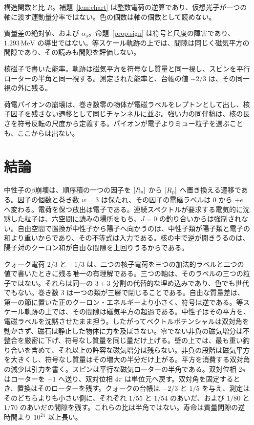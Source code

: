 \documentclass[a4paper]{article}
\begin{document}
構造関数と比 \(R\)。補題~\ref{lem:chart} は整数電荷の逆算であり、仮想光子が一つの軸に渡す運動量分率ではない。色の個数は軸の個数として読めない。

質量差の絶対値、および \(\alpha_s\)。命題~\ref{prop:sign} は符号と尺度の障害であり、\(1.293\,\mathrm{MeV}\) の導出ではない。等スケール軌跡の上では、間隙は同じく磁気平方の間隙であり、その読みも間隙を評価しない。

核磁子で書いた能率。軌跡は磁気平方を符号なし質量と同一視し、スピンを平行ローターの半角と同一視する。測定された能率と、台帳の値 \(-2/3\) は、その同一視の外に残る。

荷電パイオンの崩壊は、巻き数零の物体が電磁ラベルをレプトンとして出し、核子因子を残さない遷移として同じチャンネルに並ぶ。強い力の同伴稿は、核の長さを符号反転の尺度から定義する。パイオンが電子よりミュー粒子を選ぶことも、ここからは出ない。

\section{結論}
\label{sec:conclusion}

中性子の\(\beta\)崩壊は、順序積の一つの因子を \([R_{\rm n}]\) から \([R_{\rm p}]\) へ置き換える遷移である。因子の個数と巻き数 \(w=3\) は保たれ、その因子の電磁ラベルは \(0\) から \(+e\) へ変わる。電荷を保つ放出は電子である。連続スペクトルが要求する電気的に沈黙した粒子は、六空間に読みの場所をもち、\(J=0\) の釣り合いからは強制されない。自由空間で置換が中性子から陽子へ向かうのは、中性子類が陽子類と電子の和より重いからであり、その不等式は入力である。核の中で逆が開きうるのは、陽子対のクーロン和が自由な間隙を上回りうるからである。

クォーク電荷 \(2/3\) と \(-1/3\) は、二つの核子電荷を三つの加法的ラベルと二つの値で書いたときに残る唯一の有理解である。三つの軸は、そのラベルの三つの粒子ではない。それらは同一の \(3+3\) 分割の代替的な埋め込みであり、色でも世代でもない。巻き数 \(3\) は一つの類が三層で閉じることである。自由な質量差は、第一の節に置いた正のクーロン・エネルギーより小さく、符号は逆である。等スケール軌跡の上では、その間隙は磁気平方の超過である。中性子はその平方を、電磁ラベルを沈黙させたまま担う。したがってベクトルポテンシャルは双対角を動かさず、磁石は静止した物体に力を及ぼさない。零でない非負の磁気増分は不整合を厳密に下げ、符号なし質量を同じ量だけ上げる。壁の上では、最も重い釣り合いを含めて、それ以上の許容な磁気増分は残らない。非負の段階は磁気平方を大きくし、符号なし質量はその増大の半分だけ上がる。平方を消費する双対角の減少は引力を書く。スピンは平行な磁気ローターの半角である。双対位相 \(2\pi\) はローターを \(-1\) へ送り、双対位相 \(4\pi\) は単位元へ戻す。双対角を固定するとき、置換はそのローターを残す。クォークの台帳は \(-2/3\) と \(1/5\) を与え、測定はそのどちらよりも小さい側に、それぞれ \(1/55\) と \(1/54\) のあいだ、および \(1/80\) と \(1/70\) のあいだの間隙を残す。これらの比は半角ではない。寿命は質量間隙の逆時間より \(10^{24}\) 以上長い。
\end{document}
